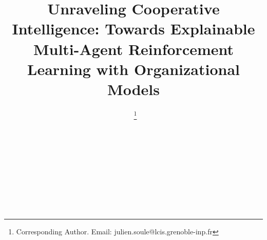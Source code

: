 \documentclass{ecai}
\begin{document}

\begin{frontmatter}




    \title{Unraveling Cooperative Intelligence: Towards Explainable Multi-Agent Reinforcement Learning with Organizational Models}



    \author[A,B]{~\thanks{Corresponding Author. Email: julien.soule@lcis.grenoble-inp.fr}}
    \author[A]{~}
    \author[A]{~}
    \author[B]{~}
    \author[C]{~}

    \address[A]{Univ. Grenoble Alpes, Grenoble INP, LCIS, 26000, Valence, France}
    \address[B]{Thales Land and Air Systems, BL IAS, Rennes, France}
    \address[C]{AICA IWG, La Guillermie, France}



\end{frontmatter}
\end{document}
